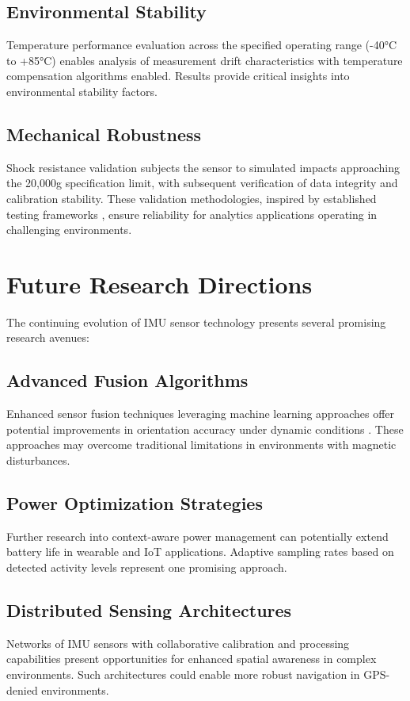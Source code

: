 \subsection{Environmental Stability}
Temperature performance evaluation across the specified operating range (-40°C to +85°C) enables analysis of measurement drift characteristics with temperature compensation algorithms enabled. Results provide critical insights into environmental stability factors.

\subsection{Mechanical Robustness}
Shock resistance validation subjects the sensor to simulated impacts approaching the 20,000g specification limit, with subsequent verification of data integrity and calibration stability. These validation methodologies, inspired by established testing frameworks \cite{Bistrov:2012}, ensure reliability for analytics applications operating in challenging environments.

\section{Future Research Directions}
The continuing evolution of IMU sensor technology presents several promising research avenues:

\subsection{Advanced Fusion Algorithms}
Enhanced sensor fusion techniques leveraging machine learning approaches offer potential improvements in orientation accuracy under dynamic conditions . These approaches may overcome traditional limitations in environments with magnetic disturbances. \cite{Bistrov:2012}

\subsection{Power Optimization Strategies}
Further research into context-aware power management can potentially extend battery life in wearable and IoT applications. Adaptive sampling rates based on detected activity levels represent one promising approach.

\subsection{Distributed Sensing Architectures}
Networks of IMU sensors with collaborative calibration and processing capabilities present opportunities for enhanced spatial awareness in complex environments. Such architectures could enable more robust navigation in GPS-denied environments. \cite{Bistrov:2012}

